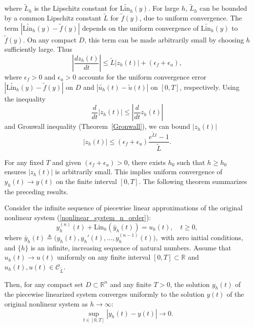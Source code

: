 \documentclass[preprint,12pt]{elsarticle}
\begin{document}
where \( \tilde L_h \) is the Lipschitz constant for \( \tilde{\text{Lin}_{h}}(y) \). For large \( h \), \( \tilde L_h \) can be bounded by a common Lipschitz constant \( \tilde L \) for \( \tilde f(y) \), due to uniform convergence. The term \( |\tilde{\text{Lin}_{h}}({y}) - \tilde f(y)| \) depends on the uniform convergence of \( \tilde{\text{Lin}_{h}}(y) \) to \( \tilde f(y) \). On any compact \( D \), this term can be made arbitrarily small by choosing \( h \) sufficiently large. Thus
\[
\left|\frac{dz_h(t)}{dt}\right| \leq \tilde L |z_h(t)| + (\epsilon_f + \epsilon_u),
\]
where \( \epsilon_f > 0 \) and $\epsilon_u >0$ accounts for the uniform convergence error \( |\tilde{\text{Lin}_{h}}({y}) - \tilde f(y)| \) on $D$ and \( |\tilde{u_{h}}({t}) - \tilde u(t)| \) on $[0,T]$, respectively.  Using the inequality
\[
\frac{d}{dt}|z_h(t)|\leq\left|\frac{d}{dt}z_h(t)\right|
\]
and Gronwall inequality (Theorem~\ref{Gronwall}), we can bound \( |z_h(t)| \)
\[
|z_h(t)| \leq (\epsilon_f + \epsilon_u) \frac{e^{\tilde Lt} - 1}{\tilde L}.
\]

For any fixed \( T\) and given \( (\epsilon_f + \epsilon_u) > 0 \), there exists \( h_0 \) such that \( h \geq h_0\) ensures \( |z_h(t)| \) is arbitrarily small. This implies uniform convergence of \( y_h(t) \to y(t) \) on the finite interval $[0,T]$. The following theorem summarizes the preceding results.
\begin{thm}\label{thm:convergence}
Consider the infinite sequence of piecewise linear approximations of the original nonlinear system (\ref{nonlinear_system_n_order}):  
\[
y_h^{(n)}(t) + \text{Lin}_{h}(\bar{y}_h(t)) = u_h(t), \quad t \geq 0,
\]  
where 
\(
\bar{y}_h(t) \triangleq \big(y_h(t), y_h'(t), \dots, y_h^{(n-1)}(t)\big),
\)
with zero initial conditions, and \( \{h\} \) is an infinite, increasing sequence of natural numbers. Assume that  
 \( u_h(t) \to u(t) \) uniformly on any finite interval \( [0, T] \subset \mathbb{R} \) and  \( u_h(t), u(t) \in \mathcal{C}_{\tilde{L}} \).  

Then, for any compact set \( D \subset \mathbb{R}^n \) and any finite \( T > 0 \), the solution \( y_h(t) \) of the piecewise linearized system converges uniformly to the solution \( y(t) \) of the original nonlinear system as \( h \to \infty \):  
\[
\sup_{t \in [0, T]} |y_h(t) - y(t)| \to 0.
\]
\end{thm}
\end{document}
